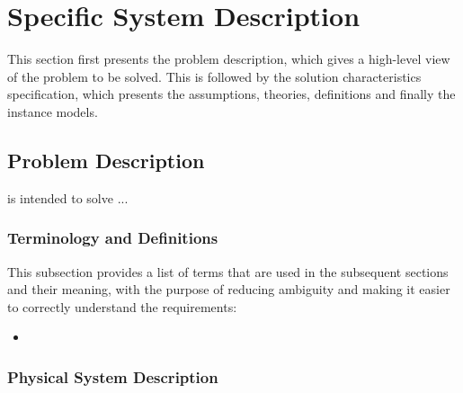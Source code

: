 \documentclass[12pt]{article}
\begin{document}
\section{Specific System Description}

This section first presents the problem description, which gives a high-level
view of the problem to be solved. This is followed by the solution
characteristics specification, which presents the assumptions, theories,
definitions and finally the instance models. 

\subsection{Problem Description} \label{Sec_pd}

\progname{} is intended to solve ... 

\subsubsection{Terminology and  Definitions}


This subsection provides a list of terms that are used in the subsequent
sections and their meaning, with the purpose of reducing ambiguity and making
it easier to correctly understand the requirements:

\begin{itemize}

  \item

\end{itemize}

\subsubsection{Physical System Description} \label{sec_phySystDescrip}
\end{document}
